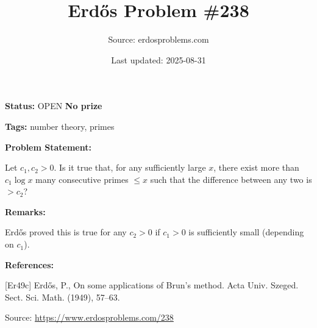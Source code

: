 \documentclass{article}
\title{Erd\H{o}s Problem \#238}
\date{Last updated: 2025-08-31}
\author{Source: erdosproblems.com}
\begin{document}
\maketitle

\noindent\textbf{Status:} OPEN \quad \textbf{No prize}

\noindent\textbf{Tags:} number theory, primes

\medskip
\noindent\textbf{Problem Statement:}

Let $c_1,c_2>0$. Is it true that, for any sufficiently large $x$, there exist more than $c_1\log x$ many consecutive primes $\leq x$ such that the difference between any two is $>c_2$?

\bigskip
\noindent\textbf{Remarks:}

Erd\H{o}s \cite{Er49c} proved this is true for any $c_2>0$ if $c_1>0$ is sufficiently small (depending on $c_1$).

\bigskip
\noindent\textbf{References:}

[Er49c] Erd\H{o}s, P., On some applications of {B}run's method. Acta Univ. Szeged. Sect. Sci. Math. (1949), 57--63.

\bigskip
\noindent\small{Source: \url{https://www.erdosproblems.com/238}}
\end{document}

